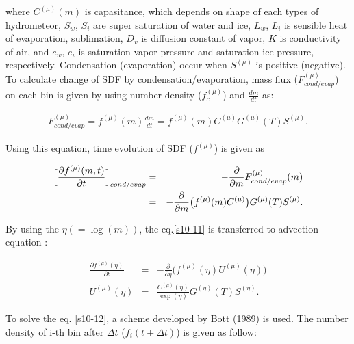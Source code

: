 where $C^{(\mu)}(m)$ is capasitance, which depends on shape of each types of hydrometeor, $S_{w}$, $S_{i}$ are super saturation of water and ice, $L_{w}$, $L_{i}$ is sensible heat of evaporation, sublimation, $D_{v}$ is diffusion constant of vapor, $K$ is conductivity of air, and $e_{w}$, $e_{i}$ is saturation vapor pressure and saturation ice pressure, respectively. Condensation (evaporation) occur when $S^{(\mu)}$ is positive (negative).\\
To calculate change of SDF by condensation/evaporation, mass flux ($F^{(\mu)}_{cond/evap}$) on each bin is given by using number density ($f_{c}^{(\mu)}$) and $\frac{dm}{dt}$ as:

\begin{eqnarray}
F^{(\mu)}_{cond/evap}=f^{(\mu)}(m)\frac{dm}{dt}=f^{(\mu)}(m)C^{(\mu)}G^{(\mu)}(T)S^{(\mu)}.\label{s10-10}
\end{eqnarray}

Using this equation, time evolution of SDF ($f^{(\mu)}$) is given as

\begin{eqnarray}
\Bigl[\frac{\partial f^{(\mu)}(m,t)}{\partial t}\Bigr]_{cond/evap}&=&-\frac{\partial}{\partial m}F^{(\mu)}_{cond/evap}(m)\nonumber\\
&=&-\frac{\partial}{\partial m}\bigl (f^{(\mu)}(m)C^{(\mu)}\bigr ) G^{(\mu)}(T)S^{(\mu)}.\label{s10-11}
\end{eqnarray}


By using the $\eta(=\log(m))$, the eq.\ref{s10-11} is transferred to advection equation :

\begin{eqnarray}
\frac{\partial f^{(\mu)}(\eta)}{\partial t}&=&-\frac{\partial}{\partial \eta}\bigl ( f^{(\mu)}(\eta)U^{(\mu)}(\eta)\bigr)\label{s10-12}\\
U^{(\mu)}(\eta)&=&\frac{C^{(\mu)}(\eta)}{\exp (\eta)}G^{(\eta)}(T)S^{(\eta)}.\nonumber
\end{eqnarray}

To solve the eq. \ref{s10-12}, a scheme developed by Bott (1989) is used. The number density of i-th bin after $\Delta t$ ($f_{i}(t+\Delta t)$) is given as follow:

